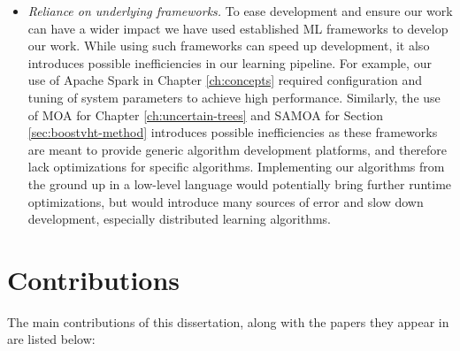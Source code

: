 \begin{itemize}
	\item \emph{Reliance on underlying frameworks.} To ease development and ensure
	our work can have a wider impact we have used established ML frameworks to develop
	our work. While using such frameworks can speed up development, it also introduces possible inefficiencies
	in our learning pipeline. For example, our use of Apache Spark \cite{spark}
	in Chapter \ref{ch:concepts} required configuration and tuning of system
	parameters to achieve high performance. Similarly, the use of MOA for
	Chapter \ref{ch:uncertain-trees} and SAMOA for Section \ref{sec:boostvht-method}
	introduces possible inefficiencies as these frameworks are meant to provide
	generic algorithm development platforms, and therefore lack optimizations for specific algorithms. Implementing our algorithms from the
	ground up in a low-level language would potentially bring further runtime
	optimizations, but would introduce many sources of error and slow down development, especially
	distributed learning algorithms.
\end{itemize}

\section{Contributions}

The main contributions of this dissertation, along with the papers they appear in
are listed below:

